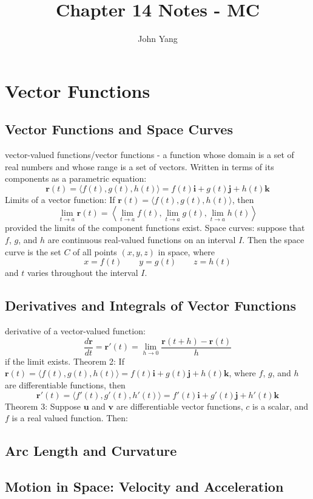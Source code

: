 \documentclass{article}
\title{Chapter 14 Notes - MC} %
\author{John Yang}
\begin{document}
    \maketitle
    \tableofcontents
    \section{Vector Functions} %
    \subsection{Vector Functions and Space Curves} %
    \begin{outline}
        \1 vector-valued functions/vector functions - a function whose domain is a set of real numbers and whose range is a set of vectors. Written in terms of its components as a parametric equation: \[\mathbf r(t)=\langle f(t),g(t),h(t)\rangle=f(t)\mathbf i+g(t)\mathbf j+h(t)\mathbf k\]
        \1 Limits of a vector function: If \(\mathbf r(t)=\langle f(t),g(t),h(t)\rangle\), then \[\lim_{t\to a}\mathbf r(t)=\left\langle\lim_{t\to a}f(t),\lim_{t\to a}g(t),\lim_{t\to a}h(t)\right\rangle\] provided the limits of the component functions exist. 
        \1 Space curves: suppose that $f$, $g$, and $h$ are continuous real-valued functions on an interval $I$. Then the space curve is the set $C$ of all points \((x,y,z)\) in space, where \[x=f(t)\qquad y=g(t)\qquad z=h(t)\] and $t$ varies throughout the interval $I$. 
    \end{outline}
    \subsection{Derivatives and Integrals of Vector Functions}
    \begin{outline}
        \1 derivative of a vector-valued function: \[\dfrac{d\mathbf r}{dt}=\mathbf r'(t)=\lim_{h\to 0}\dfrac{\mathbf r(t+h)-\mathbf r(t)}{h}\] if the limit exists. 
        \1 Theorem 2: If \(\mathbf r(t)=\langle f(t),g(t),h(t)\rangle=f(t)\mathbf i+g(t)\mathbf j+h(t)\mathbf k\), where $f$, $g$, and $h$ are differentiable functions, then \[\mathbf r'(t)=\langle f'(t),g'(t),h'(t)\rangle =f'(t)\mathbf i+g'(t)\mathbf j+h'(t)\mathbf k\]
        \1 Theorem 3: Suppose $\mathbf u$ and $\mathbf v$ are differentiable vector functions, $c$ is a scalar, and $f$ is a real valued function. Then: %
        
    \end{outline}
    \subsection{Arc Length and Curvature}
    \begin{outline}
        
    \end{outline}
    \subsection{Motion in Space: Velocity and Acceleration}
    \begin{outline}
        
    \end{outline}
\end{document}
